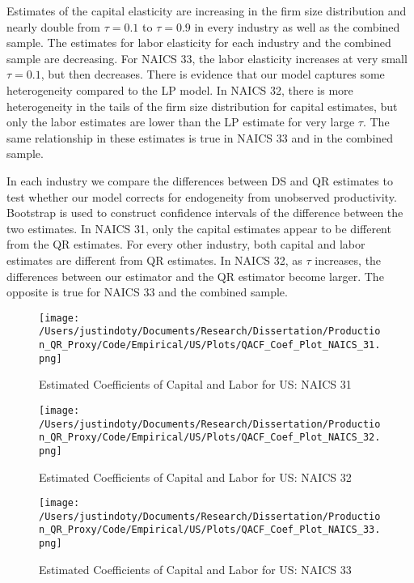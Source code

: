 \documentclass[11pt]{article}
\begin{document}
Estimates of the capital elasticity are increasing in the firm size distribution and nearly double from $\tau=0.1$ to $\tau=0.9$ in every industry as well as the combined sample.  The estimates for labor elasticity for each industry and the combined sample are decreasing. For NAICS 33, the labor elasticity increases at very small $\tau=0.1$, but then decreases. There is evidence that our model captures some heterogeneity compared to the LP model. In NAICS 32, there is more heterogeneity in the tails of the firm size distribution for capital estimates, but only the labor estimates are lower than the LP estimate for very large $\tau$. The same relationship in these estimates is true in NAICS 33 and in the combined sample. 

In each industry we compare the differences between DS and QR estimates to test whether our model corrects for endogeneity from unobserved productivity. Bootstrap is used to construct confidence intervals of the difference between the two estimates. In NAICS 31, only the capital estimates appear to be different from the QR estimates. For every other industry, both capital and labor estimates are different from QR estimates. In NAICS 32, as $\tau$ increases, the differences between our estimator and the QR estimator become larger. The opposite is true for NAICS 33 and the combined sample.
\begin{figure}[H]
\centering
\caption{Estimated Coefficients of Capital and Labor for US: NAICS 31}
\texttt{[image: /Users/justindoty/Documents/Research/Dissertation/Production\_QR\_Proxy/Code/Empirical/US/Plots/QACF\_Coef\_Plot\_NAICS\_31.png]}
\label{fig:ACF31coef}
\end{figure}

\begin{figure}[H]
\centering
\caption{Estimated Coefficients of Capital and Labor for US: NAICS 32}
\texttt{[image: /Users/justindoty/Documents/Research/Dissertation/Production\_QR\_Proxy/Code/Empirical/US/Plots/QACF\_Coef\_Plot\_NAICS\_32.png]}
\label{fig:ACF32coef}
\end{figure}

\begin{figure}[H]
\centering
\caption{Estimated Coefficients of Capital and Labor for US: NAICS 33}
\texttt{[image: /Users/justindoty/Documents/Research/Dissertation/Production\_QR\_Proxy/Code/Empirical/US/Plots/QACF\_Coef\_Plot\_NAICS\_33.png]}
\label{fig:ACF33coef}
\end{figure}
\end{document}
